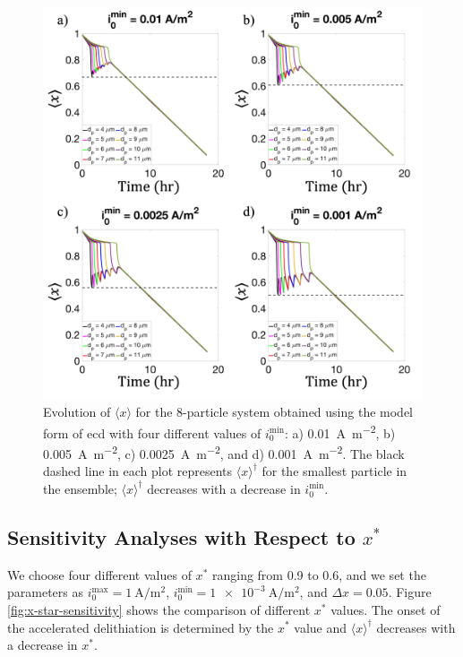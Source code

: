 \documentclass{article}
\begin{document}
\begin{figure}
  \includegraphics[width=\textwidth]{8-particle-evolution-i0min.png}
  \caption{Evolution of $\langle x \rangle$ for the 8-particle system obtained using
    the model form of \gls{ecd} with four different values of
    $i_0^{\mathrm{min}}$: a) \SI{0.01}{\ampere\per\meter\squared}, b)
    \SI{0.005}{\ampere\per\meter\squared}, c)
    \SI{0.0025}{\ampere\per\meter\squared}, and d)
    \SI{0.001}{\ampere\per\meter\squared}. The black dashed line in
    each plot represents $\langle x \rangle^\dag$ for the smallest particle in the
    ensemble; $\langle x \rangle^\dag$ decreases with a decrease in $i_0^{\mathrm{min}}$.}
  \label{fig:i0-sensitivity}
\end{figure}

\subsection{Sensitivity Analyses with Respect to $x^{\ast}$}

We choose four different values of $x^{\ast}$ ranging from 0.9 to 0.6,
and we set the parameters as
$i_0^{\mathrm{max}}=\SI{1}{\ampere\per\meter\squared}$,
$i_0^{\mathrm{min}}=\SI{1e-3}{\ampere\per\meter\squared}$, and $\Delta
x=0.05$. Figure \ref{fig:x-star-sensitivity} shows the comparison of
different $x^{\ast }$ values. The onset of the accelerated
delithiation is determined by the $x^\ast$ value and $\langle x
\rangle^\dag$ decreases with a decrease in $x^\ast$.
\end{document}
